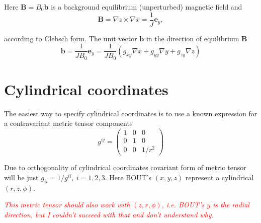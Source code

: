 \documentclass[11pt, oneside]{article}
\begin{document}
Here $\mathbf{B} = B_0 \mathbf{b}$ is a background equilibrium (unperturbed) magnetic field and
\begin{equation}\label{clebsch}
\mathbf{B} = \nabla z \times \nabla x = \frac1{J}\mathbf{e}_y, %
\end{equation}

according to Clebsch form. The unit vector $\mathbf{b}$ in the direction of equilibrium $\mathbf{B}$
\begin{equation}
\mathbf{b} = \frac1{JB_0} \mathbf{e}_y = \frac1{JB_0}\left(g_{xy}\nabla x + g_{yy}\nabla y + g_{zy}\nabla z\right)
\end{equation}


\section{Cylindrical coordinates}
The easiest way to specify cylindrical coordinates is to use a known expression for a contravariant metric tensor components
\begin{equation}\label{metric1}
g^{ij} =
\begin{pmatrix}
1 & 0 & 0 \\ 0 & 1 & 0 \\ 0 & 0 & 1 / r^2
\end{pmatrix}
\end{equation}

Due to orthogonality of cylindrical coordinates covariant form of metric tensor will be just $g_{ii} = 1 / g^{ii}, \ i = 1,2,3$. Here BOUT's $(x,y,z)$ represent a cylindrical $(r,z,\phi)$. 

\textcolor{red}{\emph{This metric tensor should also work with $(z,r,\phi)$, i.e. BOUT's $y$ is the radial direction, but I couldn't succeed with that and don't understand why. }}
\end{document}
